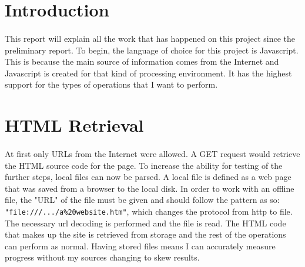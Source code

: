 \documentclass[11pt]{article}
\begin{document}
\title{\vspace{-2.5cm}{\Large Story Evolution Tracker: Progress Report I}\vspace{-0.5cm}}
\author{Violet Avkhukova -- 1573866\\k1594626@kcl.ac.uk -- Odinaldo Rodrigues}
\date{\vspace{-0.3cm}\today}
\maketitle

\setlength{\parskip}{-0.9em}
\lstset{basicstyle=\ttfamily, breaklines=true}

\section{Introduction}
\paragraph{}
This report will explain all the work that has happened on this project since the preliminary report. To begin, the language of choice for this project is Javascript. This is because the main source of information comes from the Internet and Javascript is created for that kind of processing environment. It has the highest support for the types of operations that I want to perform. 

\section{HTML Retrieval}
\paragraph{}
At first only URLs from the Internet were allowed. A GET request would retrieve the HTML source code for the page. To increase the ability for testing of the further steps, local files can now be parsed. A local file is defined as a web page that was saved from a browser to the local disk. In order to work with an offline file, the "URL" of the file must be given and should follow the pattern as so: \lstinline|"file:///.../a%20website.htm"|, which changes the protocol from http to file. The necessary url decoding is performed and the file is read. The HTML code that makes up the site is retrieved from storage and the rest of the operations can perform as normal. Having stored files means I can accurately measure progress without my sources changing to skew results.
\end{document}
